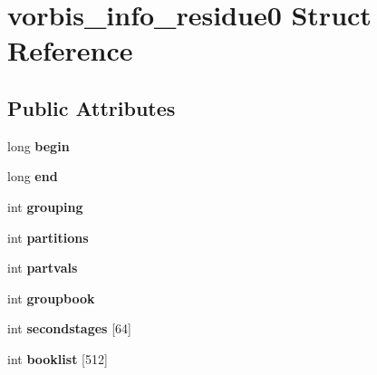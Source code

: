 \hypertarget{structvorbis__info__residue0}{\section{vorbis\+\_\+info\+\_\+residue0 Struct Reference}
\label{structvorbis__info__residue0}
}
\subsection*{Public Attributes}
\begin{DoxyCompactItemize}
\item 
\hypertarget{structvorbis__info__residue0_a655b0a80983f1646b7ad64fce2a14732}{long {\bfseries begin}}\label{structvorbis__info__residue0_a655b0a80983f1646b7ad64fce2a14732}

\item 
\hypertarget{structvorbis__info__residue0_af8ce4aeb45a448181c3cd5079908627c}{long {\bfseries end}}\label{structvorbis__info__residue0_af8ce4aeb45a448181c3cd5079908627c}

\item 
\hypertarget{structvorbis__info__residue0_afc030387b36d8397db6014464a8103c2}{int {\bfseries grouping}}\label{structvorbis__info__residue0_afc030387b36d8397db6014464a8103c2}

\item 
\hypertarget{structvorbis__info__residue0_a466dc773410639c9786d33301cac61ed}{int {\bfseries partitions}}\label{structvorbis__info__residue0_a466dc773410639c9786d33301cac61ed}

\item 
\hypertarget{structvorbis__info__residue0_a44650904dcc80ac19b1d3a0ee910be62}{int {\bfseries partvals}}\label{structvorbis__info__residue0_a44650904dcc80ac19b1d3a0ee910be62}

\item 
\hypertarget{structvorbis__info__residue0_aa3b476197866f9666cc4294f60273f84}{int {\bfseries groupbook}}\label{structvorbis__info__residue0_aa3b476197866f9666cc4294f60273f84}

\item 
\hypertarget{structvorbis__info__residue0_a744daf253a651d2e13a3f80d4220c28e}{int {\bfseries secondstages} \mbox{[}64\mbox{]}}\label{structvorbis__info__residue0_a744daf253a651d2e13a3f80d4220c28e}

\item 
\hypertarget{structvorbis__info__residue0_a8ccd8efac3cb904de700849ca5c9b765}{int {\bfseries booklist} \mbox{[}512\mbox{]}}\label{structvorbis__info__residue0_a8ccd8efac3cb904de700849ca5c9b765}


\end{DoxyCompactItemize}
